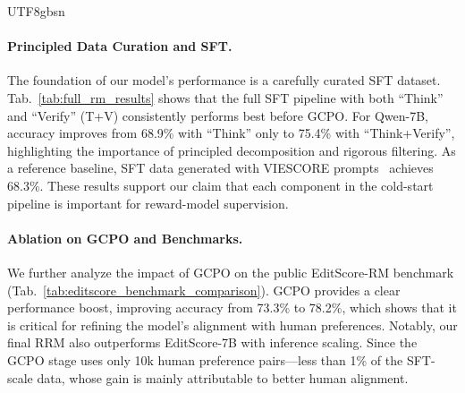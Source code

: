 \documentclass{llmxive}
\providecommand{\gcpo}{GCPO}
\begin{document}
\begin{CJK*}{UTF8}{gbsn}
\paragraph{Principled Data Curation and SFT.}
The foundation of our model's performance is a carefully curated SFT dataset. Tab.~\ref{tab:full_rm_results} shows that the full SFT pipeline with both ``Think'' and ``Verify'' (T+V) consistently performs best before GCPO. For Qwen-7B, accuracy improves from 68.9\% with ``Think'' only to 75.4\% with ``Think+Verify'', highlighting the importance of principled decomposition and rigorous filtering. As a reference baseline, SFT data generated with VIESCORE prompts~\cite{ku2024viescore} achieves 68.3\%. These results support our claim that each component in the cold-start pipeline is important for reward-model supervision.
\paragraph{Ablation on GCPO and Benchmarks.} 
We further analyze the impact of \gcpo{} on the public EditScore-RM benchmark (Tab.~\ref{tab:editscore_benchmark_comparison}). GCPO provides a clear performance boost, improving accuracy from 73.3\% to 78.2\%, which shows that it is critical for refining the model's alignment with human preferences. Notably, our final RRM also outperforms EditScore-7B with inference scaling. Since the GCPO stage uses only 10k human preference pairs---less than 1\% of the SFT-scale data, whose gain is mainly attributable to better human alignment.

\end{CJK*}
\end{document}
